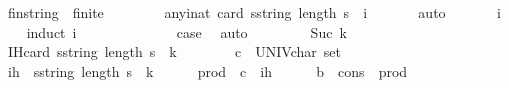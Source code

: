\begin{isabellebody}
\begin{isamarkuptext}
\end{isamarkuptext}\isamarkuptrue%
\isamarkupfalse%
\ fin{\isacharunderscore}string\ {\isacharcolon}{\isacharcolon}\ finite\ \isanewline
{}\isamarkupfalse%
%
\isadelimproof
\ %
\endisadelimproof
%
\isatagproof
{}\isamarkupfalse%
\ \isanewline
\ \ \isamarkupfalse%
\ any{\isacharcolon}{\isachardoublequoteopen}{\isasymforall}i{\isacharcolon}{\isacharcolon}nat{\isachardot}\ card\ {\isacharbraceleft}s{\isacharcolon}{\isacharcolon}string{\isachardot}\ length\ s\ {\isasymle}\ i{\isacharbraceright}\ {\isachargreater}\ {}{\isachardoublequoteclose}\isanewline
\ \ \ \ \isamarkupfalse%
{\isacharparenleft}auto{\isacharparenright}\isanewline
\ \ \ \ \isamarkupfalse%
\ \ i\isanewline
\ \ \isamarkupfalse%
\ {\isacharparenleft}induct\ i{\isacharparenright}\isanewline
\ \ \ \ \isamarkupfalse%
\ {}\isanewline
\ \ \ \ \isamarkupfalse%
\ \isamarkupfalse%
\ {\isacharquery}case\ \isamarkupfalse%
\ auto\isanewline
\ \ \isamarkupfalse%
\isanewline
\ \ \ \ \isamarkupfalse%
\ {\isacharparenleft}Suc\ k{\isacharparenright}\isanewline
\ \ \ \ \isamarkupfalse%
\ IH{\isacharcolon}{\isachardoublequoteopen}card\ {\isacharbraceleft}s{\isacharcolon}{\isacharcolon}string{\isachardot}\ length\ s\ {\isasymle}\ k{\isacharbraceright}\ {\isachargreater}\ {}{\isachardoublequoteclose}\isanewline
\ \ \ \ \isamarkupfalse%
\ {\isacharquery}c\ {\isacharequal}\ {\isachardoublequoteopen}{\isacharparenleft}UNIV{\isacharcolon}{\isacharcolon}char\ set{\isacharparenright}{\isachardoublequoteclose}\isanewline
\ \ \ \ \isamarkupfalse%
\ {\isacharquery}ih\ {\isacharequal}\ {\isachardoublequoteopen}{\isacharbraceleft}s{\isacharcolon}{\isacharcolon}string{\isachardot}\ length\ s\ {\isasymle}\ k{\isacharbraceright}{\isachardoublequoteclose}\isanewline
\ \ \ \ \isamarkupfalse%
\ {\isacharquery}prod\ {\isacharequal}\ {\isachardoublequoteopen}{\isacharparenleft}{\isacharquery}c\ {\isasymtimes}\ {\isacharquery}ih{\isacharparenright}{\isachardoublequoteclose}\isanewline
\ \ \ \ \isamarkupfalse%
\ {\isacharquery}b\ {\isacharequal}\ {\isachardoublequoteopen}{\isacharparenleft}cons\ {\isacharbackquote}\ {\isacharquery}prod{\isacharparenright}{\isachardoublequoteclose}\isanewline
\ \ \ \ \isamarkupfalse%

\end{isabellebody}
